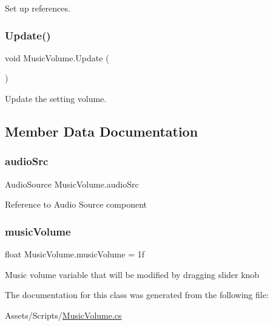 Set up references. 

\mbox{\label{class_music_volume_a6c614e49e612ee4ab49edf2d45d48a61}} 
\subsubsection{\texorpdfstring{Update()}{Update()}}
{\footnotesize\ttfamily void Music\+Volume.\+Update (\begin{DoxyParamCaption}{ }\end{DoxyParamCaption})\hspace{0.3cm}{\ttfamily [private]}}



Update the setting volume. 



\subsection{Member Data Documentation}
\mbox{\label{class_music_volume_afdba679e336ee79f311e1f16f525bd3c}} 
\subsubsection{\texorpdfstring{audioSrc}{audioSrc}}
{\footnotesize\ttfamily Audio\+Source Music\+Volume.\+audio\+Src\hspace{0.3cm}{\ttfamily [private]}}

Reference to Audio Source component \mbox{\label{class_music_volume_a01774a02d195ef985412f3120d63f1e6}} 
\subsubsection{\texorpdfstring{musicVolume}{musicVolume}}
{\footnotesize\ttfamily float Music\+Volume.\+music\+Volume = 1f\hspace{0.3cm}{\ttfamily [private]}}

Music volume variable that will be modified by dragging slider knob 

The documentation for this class was generated from the following file\+:\begin{DoxyCompactItemize}
\item 
Assets/\+Scripts/\mbox{\hyperlink{_music_volume_8cs}{Music\+Volume.\+cs}}\end{DoxyCompactItemize}
